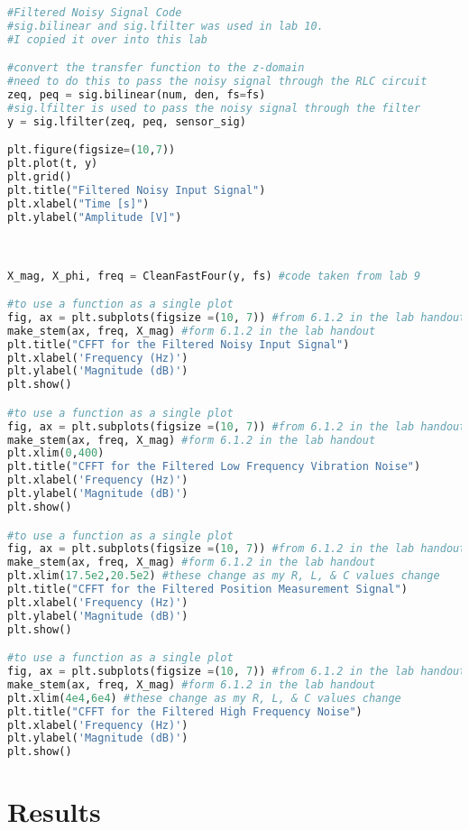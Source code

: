 \documentclass[12pt]{report}
\begin{document}
\begin{lstlisting}[language=Python]
#Filtered Noisy Signal Code
#sig.bilinear and sig.lfilter was used in lab 10. 
#I copied it over into this lab

#convert the transfer function to the z-domain
#need to do this to pass the noisy signal through the RLC circuit
zeq, peq = sig.bilinear(num, den, fs=fs)  
#sig.lfilter is used to pass the noisy signal through the filter
y = sig.lfilter(zeq, peq, sensor_sig)

plt.figure(figsize=(10,7))
plt.plot(t, y)
plt.grid()
plt.title("Filtered Noisy Input Signal")
plt.xlabel("Time [s]")
plt.ylabel("Amplitude [V]") 



X_mag, X_phi, freq = CleanFastFour(y, fs) #code taken from lab 9

#to use a function as a single plot
fig, ax = plt.subplots(figsize =(10, 7)) #from 6.1.2 in the lab handout
make_stem(ax, freq, X_mag) #form 6.1.2 in the lab handout
plt.title("CFFT for the Filtered Noisy Input Signal")
plt.xlabel('Frequency (Hz)')
plt.ylabel('Magnitude (dB)')
plt.show()

#to use a function as a single plot
fig, ax = plt.subplots(figsize =(10, 7)) #from 6.1.2 in the lab handout
make_stem(ax, freq, X_mag) #form 6.1.2 in the lab handout
plt.xlim(0,400)
plt.title("CFFT for the Filtered Low Frequency Vibration Noise")
plt.xlabel('Frequency (Hz)')
plt.ylabel('Magnitude (dB)')
plt.show()

#to use a function as a single plot
fig, ax = plt.subplots(figsize =(10, 7)) #from 6.1.2 in the lab handout
make_stem(ax, freq, X_mag) #form 6.1.2 in the lab handout
plt.xlim(17.5e2,20.5e2) #these change as my R, L, & C values change
plt.title("CFFT for the Filtered Position Measurement Signal")
plt.xlabel('Frequency (Hz)')
plt.ylabel('Magnitude (dB)')
plt.show()

#to use a function as a single plot
fig, ax = plt.subplots(figsize =(10, 7)) #from 6.1.2 in the lab handout
make_stem(ax, freq, X_mag) #form 6.1.2 in the lab handout
plt.xlim(4e4,6e4) #these change as my R, L, & C values change
plt.title("CFFT for the Filtered High Frequency Noise")
plt.xlabel('Frequency (Hz)')
plt.ylabel('Magnitude (dB)')
plt.show()  
\end{lstlisting}
\newpage

\section{Results}
\end{document}
